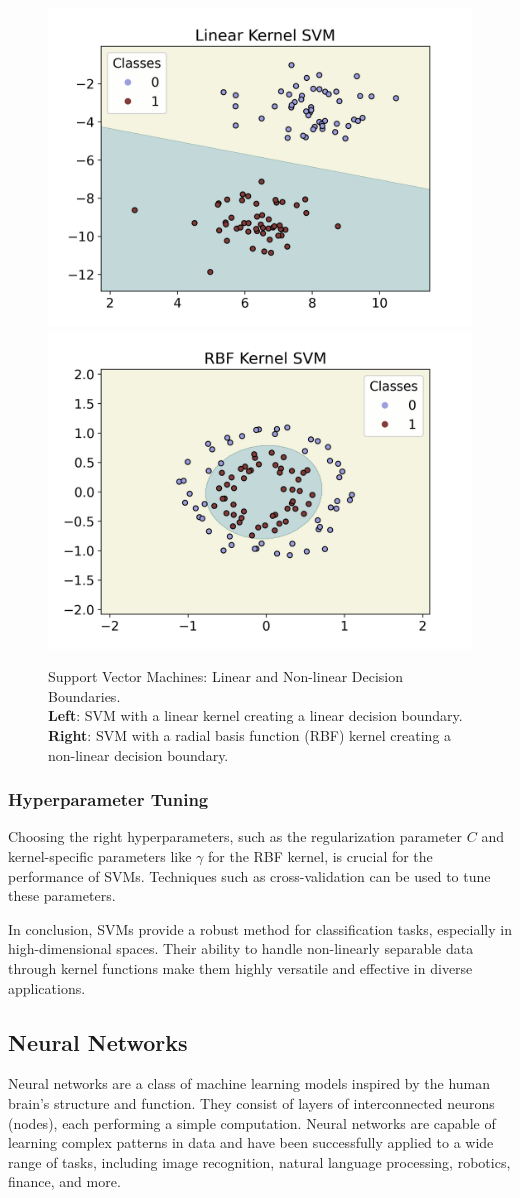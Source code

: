 \documentclass[english,11pt,a4paper,titlepage]{article}
\begin{document}
	\begin{figure}[th]
		\centering
		\includegraphics[width=0.45\linewidth]{img/svm_linear.png}
		\includegraphics[width=0.45\linewidth]{img/svm_nonlinear.png}
		\caption{Support Vector Machines: Linear and Non-linear Decision Boundaries. \\ \textbf{Left}: SVM with a linear kernel creating a linear decision boundary. \textbf{Right}: SVM with a radial basis function (RBF) kernel creating a non-linear decision boundary.}
		\label{fig:svm_examples}
	\end{figure}
	
	\subsubsection*{Hyperparameter Tuning}
	Choosing the right hyperparameters, such as the regularization parameter \( C \) and kernel-specific parameters like \( \gamma \) for the RBF kernel, is crucial for the performance of SVMs. Techniques such as cross-validation can be used to tune these parameters.
	
	In conclusion, SVMs provide a robust method for classification tasks, especially in high-dimensional spaces. Their ability to handle non-linearly separable data through kernel functions make them highly versatile and effective in diverse applications.
	
	\subsection*{Neural Networks}
	Neural networks are a class of machine learning models inspired by the human brain's structure and function. They consist of layers of interconnected neurons (nodes), each performing a simple computation. Neural networks are capable of learning complex patterns in data and have been successfully applied to a wide range of tasks, including image recognition, natural language processing, robotics, finance, and more.
	
\end{document}

